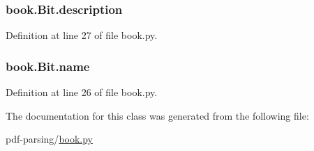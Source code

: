 \subsubsection[{\texorpdfstring{description}{description}}]{\setlength{\rightskip}{0pt plus 5cm}book.\+Bit.\+description}\hypertarget{classbook_1_1_bit_ab61abe9a7a3607b1c91b23258b839919}{}\label{classbook_1_1_bit_ab61abe9a7a3607b1c91b23258b839919}


Definition at line 27 of file book.\+py.

\subsubsection[{\texorpdfstring{name}{name}}]{\setlength{\rightskip}{0pt plus 5cm}book.\+Bit.\+name}\hypertarget{classbook_1_1_bit_a37f0afda871e4a61488aee20da6c9a50}{}\label{classbook_1_1_bit_a37f0afda871e4a61488aee20da6c9a50}


Definition at line 26 of file book.\+py.



The documentation for this class was generated from the following file\+:\begin{DoxyCompactItemize}
\item 
pdf-\/parsing/\hyperlink{book_8py}{book.\+py}\end{DoxyCompactItemize}
